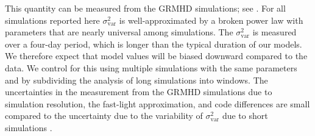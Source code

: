 This quantity can be measured from the GRMHD simulations; see \citet{Georgiev_2022}. For all simulations reported here $\sigma_\text{var}^2$ is well-approximated by a broken power law with parameters that are nearly universal among simulations.
The $\sigma_\text{var}^2$ is measured over a four-day period, which is longer than the typical duration of our models.  We therefore expect that model values will be biased downward compared to the data.  We control for this using multiple simulations with the same parameters and by subdividing the analysis of long simulations into windows.
The uncertainties in the measurement from the GRMHD simulations due to simulation resolution, the fast-light approximation, and code differences are small compared to the uncertainty due to the variability of $\sigma_\text{var}^2$ due to short simulations \citep{Georgiev_2022}.

